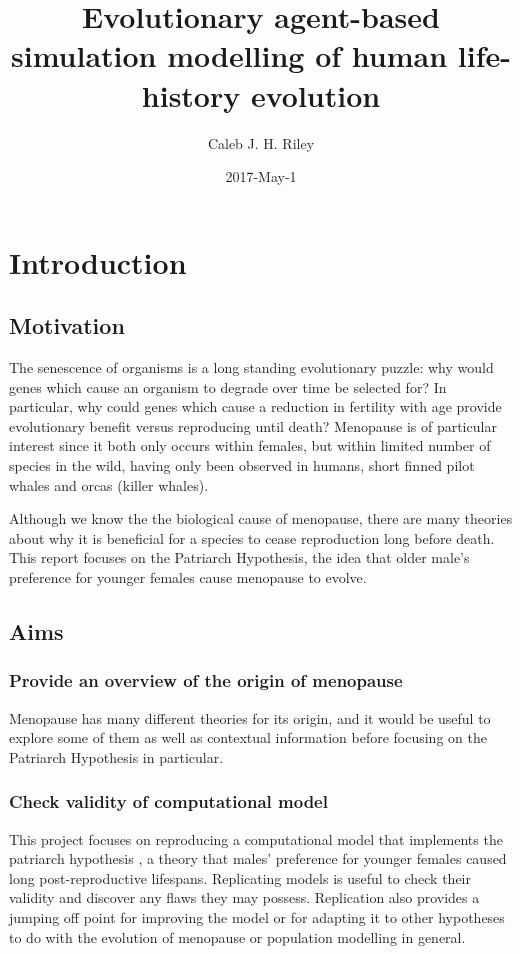 \documentclass[authoryearcitations]{UoYCSproject}
\author{Caleb J. H. Riley}
\title{Evolutionary agent-based simulation modelling of human life-history evolution}
\date{2017-May-1}
\begin{document}
\maketitle
\listoffigures
\listoftables

\cleardoublepage

\chapter{Introduction}
\label{cha:Introduction}
\section{Motivation}
The senescence of organisms is a long standing evolutionary puzzle: why would genes which cause an organism to degrade over time be selected for? In particular, why could genes which cause a reduction in fertility with age provide evolutionary benefit versus reproducing until death? Menopause is of particular interest since it both only occurs within females, but within limited number of species in the wild, having only been observed in humans, short finned pilot whales and orcas (killer whales).

Although we know the the biological cause of menopause, there are many theories about why it is beneficial for a species to cease reproduction long before death. This report focuses on the Patriarch Hypothesis, the idea that older male's preference for younger females cause menopause to evolve. 


\section{Aims}
\subsection{Provide an overview of the origin of menopause}
Menopause has many different theories for its origin, and it would be useful to explore some of them as well as contextual information before focusing on the Patriarch Hypothesis in particular.


\subsection{Check validity of computational model}
This project focuses on reproducing a computational model \cite{mateChoice2013} that implements the patriarch hypothesis \cite{patriarchHypothesis2000}, a theory that males' preference for younger females caused long post-reproductive lifespans. Replicating models is useful to check their validity and discover any flaws they may possess. Replication also provides a jumping off point for improving the model or for adapting it to other hypotheses to do with the evolution of menopause or population modelling in general. 
\end{document}
